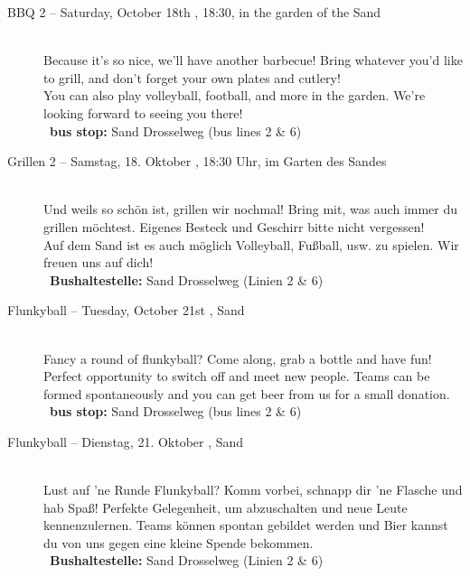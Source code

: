 \begin{description}

\ifml
    \item[BBQ 2 -- Saturday, October 18th \YEAR, 18:30, in the garden of the Sand]~\\
    Because it's so nice, we'll have another barbecue!
    Bring whatever you'd like to grill, and don’t forget your own plates and cutlery!\\
    You can also play volleyball, football, and more in the garden. We’re looking forward to seeing you there!\\
    ~\textbf{bus stop:} Sand Drosselweg (bus lines 2 \& 6)
\else
    \item[Grillen 2 -- Samstag, 18. Oktober \YEAR, 18:30 Uhr, im Garten des Sandes]~\\
    Und weils so schön ist, grillen wir nochmal!
    Bring mit, was auch immer du grillen möchtest. Eigenes Besteck und Geschirr bitte nicht vergessen!\\
    Auf dem Sand ist es auch möglich Volleyball, Fußball, usw. zu spielen. Wir freuen uns auf dich!\\
    ~\textbf{Bushaltestelle:} Sand Drosselweg (Linien 2 \& 6)
\fi

\ifml
	\item[Flunkyball -- Tuesday, October 21st \YEAR, Sand]~\\
	Fancy a round of flunkyball? Come along, grab a bottle and have fun!
	Perfect opportunity to switch off and meet new people.
	Teams can be formed spontaneously and you can get beer from us for a small donation.\\
	~\textbf{bus stop:} Sand Drosselweg (bus lines 2 \& 6)
\else
	\item[Flunkyball -- Dienstag, 21. Oktober \YEAR, Sand]~\\
	Lust auf 'ne Runde Flunkyball? Komm vorbei, schnapp dir 'ne Flasche und hab Spaß!
	Perfekte Gelegenheit, um abzuschalten und neue Leute kennenzulernen.
	Teams können spontan gebildet werden und Bier kannst du von uns gegen eine kleine Spende bekommen.\\
	~\textbf{Bushaltestelle:} Sand Drosselweg (Linien 2 \& 6)
\fi


\end{description}
